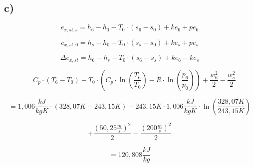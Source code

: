 

\subsection*{c)}

\begin{equation*}
e_{x,st,s} = h_6 - h_0 - T_0 \cdot (s_6 - s_0) + ke_6 + pe_6
\end{equation*}

\begin{equation*}
e_{x,st,0} = h_s - h_0 - T_0 \cdot (s_s - s_0) + ke_s + pe_s
\end{equation*}

\begin{equation*}
\Delta e_{x,st} = h_6 - h_s - T_0 \cdot (s_6 - s_s) + ke_6 - ke_s
\end{equation*}

\begin{equation*}
= C_p \cdot (T_6 - T_0) - T_0 \cdot (C_p \cdot \ln \left( \frac{T_6}{T_0} \right) - R \cdot \ln \left( \frac{p_6}{p_0} \right)) + \frac{w_6^2}{2} - \frac{w_s^2}{2}
\end{equation*}

\begin{equation*}
= 1,006 \frac{kJ}{kgK} \cdot (328,07K - 243,15K) - 243,15K \cdot 1,006 \frac{kJ}{kgK} \cdot \ln \left( \frac{328,07K}{243,15K} \right)
\end{equation*}

\begin{equation*}
+ \frac{(50,25 \frac{m}{s})^2}{2} - \frac{(200 \frac{m}{s})^2}{2}
\end{equation*}

\begin{equation*}
= 120,808 \frac{kJ}{kg}
\end{equation*}